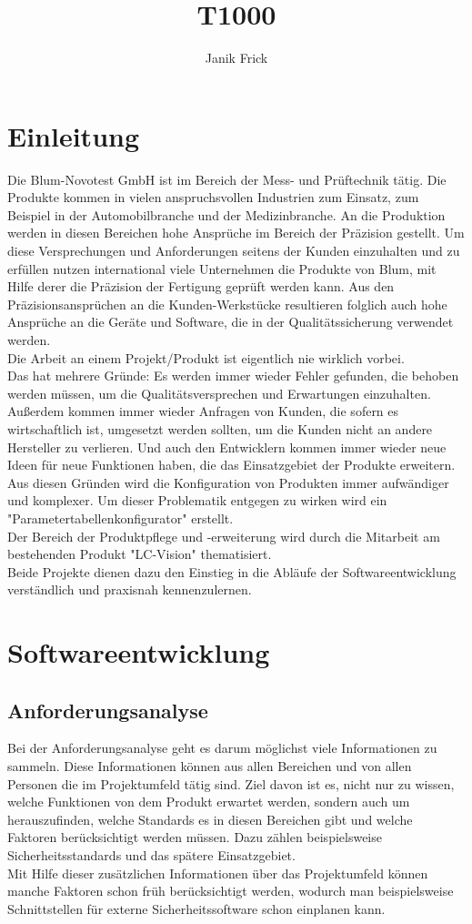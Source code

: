 \documentclass[10pt,a4paper]{article}
\author{Janik Frick}
\title{T1000}
\begin{document}

\tableofcontents
\newpage
\section{Einleitung}
Die Blum-Novotest GmbH ist im Bereich der Mess- und Prüftechnik tätig. Die Produkte kommen in vielen anspruchsvollen Industrien zum Einsatz, zum Beispiel in der Automobilbranche und der Medizinbranche. An die Produktion werden in diesen Bereichen hohe Ansprüche im Bereich der Präzision gestellt. Um diese Versprechungen und Anforderungen seitens der Kunden einzuhalten und zu erfüllen nutzen international viele Unternehmen die Produkte von Blum, mit Hilfe derer die Präzision der Fertigung geprüft werden kann. Aus den Präzisionsansprüchen an die Kunden-Werkstücke resultieren folglich auch hohe Ansprüche an die Geräte und Software, die in der Qualitätssicherung verwendet werden. \\
Die Arbeit an einem Projekt/Produkt ist eigentlich nie wirklich vorbei. 
\\Das hat mehrere Gründe: Es werden immer wieder Fehler gefunden, die behoben werden müssen, um die Qualitätsversprechen und Erwartungen einzuhalten. Außerdem kommen immer wieder Anfragen von Kunden, die sofern es wirtschaftlich ist, umgesetzt werden sollten, um die Kunden nicht an andere Hersteller zu verlieren. Und auch den Entwicklern kommen immer wieder neue Ideen für neue Funktionen haben, die das Einsatzgebiet der Produkte erweitern.\\
Aus diesen Gründen wird die Konfiguration von Produkten immer aufwändiger und komplexer. Um dieser Problematik entgegen zu wirken wird ein "Parametertabellenkonfigurator" erstellt.  
\\Der Bereich der Produktpflege und -erweiterung wird durch die Mitarbeit am bestehenden Produkt "LC-Vision" thematisiert.
\\Beide Projekte dienen dazu den Einstieg in die Abläufe der Softwareentwicklung verständlich und praxisnah kennenzulernen.
\newpage   
\section{Softwareentwicklung}
\subsection{Anforderungsanalyse}
Bei der Anforderungsanalyse geht es darum möglichst viele Informationen zu sammeln. Diese Informationen können aus allen Bereichen und von allen Personen die im Projektumfeld tätig sind. Ziel davon ist es, nicht nur zu wissen, welche Funktionen von dem Produkt erwartet werden, sondern auch um herauszufinden, welche Standards es in diesen Bereichen gibt und welche Faktoren berücksichtigt werden müssen. Dazu zählen beispielsweise Sicherheitsstandards und das spätere Einsatzgebiet. 
\\Mit Hilfe dieser zusätzlichen Informationen über das Projektumfeld können manche Faktoren schon früh berücksichtigt werden, wodurch man beispielsweise Schnittstellen für externe Sicherheitssoftware schon einplanen kann.
\end{document}
